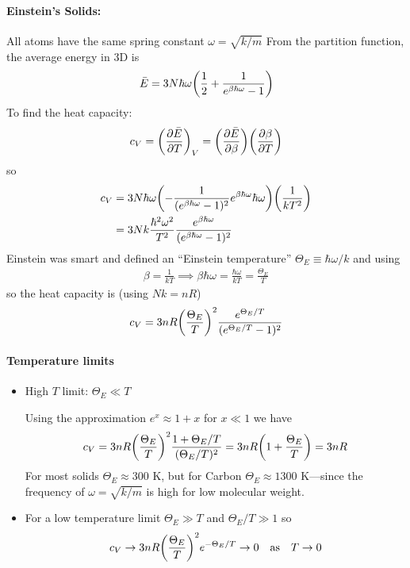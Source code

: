 \documentclass[../main.tex]{subfiles}
\begin{document}
\newpage
{}
\paragraph{Einstein's Solids:} All atoms have the same spring constant $\omega = \sqrt{k/m}$
From the partition function, the average energy in 3D is
\begin{align*}
    \bar E = 3N \hbar \omega \qt(
        \frac{1}{2} + \frac{1}{e^{\beta \hbar \omega} - 1}
    )
\end{align*}
To find the heat capacity:
\begin{align*}
    c_V = \qt(\pdv{\bar E}{T})_V = \qt(\pdv{\bar E}{\beta}) \qt(\pdv{\beta}{T})
\end{align*}
so
\begin{align*}
    c_V &= 3N \hbar \omega \qt(
        -\frac{1}{(e^{\beta \hbar \omega} - 1)^2} e^{\beta \hbar \omega} \hbar \omega
    )
    \qt(\frac{1}{kT^2}) \\
    &= 3Nk \frac{\hbar^2 \omega^2}{T^2} \frac{e^{\beta \hbar \omega}}{(e^{\beta \hbar \omega} - 1)^2}
\end{align*}
Einstein was smart and defined an ``Einstein temperature'' $\Theta_E \equiv \hbar \omega / k$ and using 
\begin{align*}
    \beta = \frac{1}{kT} \implies \beta \hbar \omega = \frac{\hbar \omega}{kT} = \frac{\Theta_E}{T}
\end{align*}
so the heat capacity is (using $Nk = nR$)
\begin{align*}
    c_V = 3 n R \qt(\frac{\Theta_E}{T})^2 \frac{e^{\Theta_E/T}}{(e^{\Theta_E/T} - 1)^2}
\end{align*}

\paragraph{Temperature limits}
\begin{itemize}
    \item High $T$ limit: $\Theta_E \ll T$

    Using the approximation $e^x \approx 1 + x$ for $x \ll 1$ we have
    \begin{align*}
        c_V = 3nR \qt(\frac{\Theta_E}{T})^2 \frac{1 + \Theta_E/T}{(\Theta_E/T)^2} = 3nR \qt(1 + \frac{\Theta_E}{T}) = 3nR
    \end{align*}
    For most solids $\Theta_E \approx 300$ K, but for Carbon $\Theta_E \approx 1300$ K---since the frequency of $\omega = \sqrt{k/m}$ is high for low molecular weight.
    \item For a low temperature limit $\Theta_E \gg T$ and $\Theta_E / T \gg 1$ so
    \begin{align*}
        c_V \to 3nR \qt(\frac{\Theta_E}{T})^2 e^{-\Theta_E/T} \to 0 \qqtext{as} T \to 0
    \end{align*}
\end{itemize}
\end{document}
